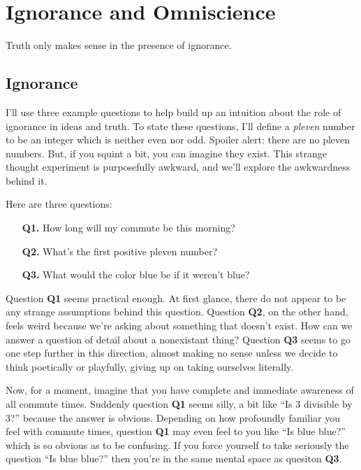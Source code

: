 \documentclass[11pt, oneside]{article}   	%
\begin{document}
%
%
%
%
%


\section{Ignorance and Omniscience}

Truth only makes sense in the presence of ignorance.

\subsection{Ignorance}

I'll use three example questions
to help build up an intuition about the role of
ignorance in ideas and truth.
To state these questions, I'll define a
{\em pleven} number to be an integer which is neither even nor odd. Spoiler
alert: there are no pleven numbers. But, if you squint a bit, you can imagine
they exist. This strange thought experiment is purposefully awkward, and we'll
explore the awkwardness behind it.

Here are three questions:
\begin{enumerate}
    \item[{\bf Q1.}] How long will my commute be this morning?
    \item[{\bf Q2.}] What's the first positive pleven number?
    \item[{\bf Q3.}] What would the color blue be if it weren't blue?
\end{enumerate}
Question {\bf Q1} seems practical enough. At first glance, there do not appear
to be any strange assumptions behind this question.
Question {\bf Q2}, on the other hand, feels weird because we're asking about
something that doesn't exist. How can we answer a question of detail about a
nonexistant thing? Question {\bf Q3} seems to go one step further in this
direction, almost making no sense unless we decide to think poetically or
playfully, giving up on taking ourselves literally.

Now, for a moment, imagine that you have complete and immediate awareness of all
commute times. Suddenly question {\bf Q1} seems silly, a bit like ``Is 3
divisible by 3?'' because the answer is obvious.
Depending on how profoundly
familiar you feel with commute times, question {\bf Q1} may even feel to you
like ``Is blue blue?'' which is so obvious as to be confusing. If you force
yourself to take seriously the question ``Is blue blue?'' then you're in the
same mental space as quesiton {\bf Q3}.
\end{document}
